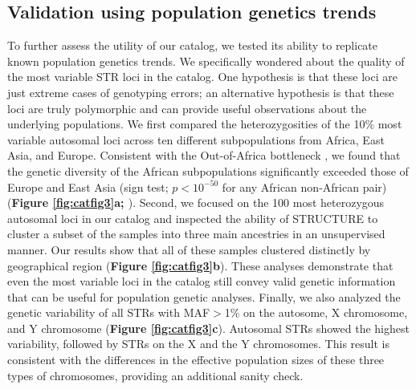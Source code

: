 \subsection{Validation using population genetics trends}
To further assess the utility of our catalog, we tested its ability to replicate known population genetics trends. We specifically wondered about the quality of the most variable STR loci in the catalog. One hypothesis is that these loci are just extreme cases of genotyping errors; an alternative hypothesis is that these loci are truly polymorphic and can provide useful observations about the underlying populations.  We first compared the heterozygosities of the 10\% most variable autosomal loci across ten different subpopulations from Africa, East Asia, and Europe. Consistent with the Out-of-Africa bottleneck \cite{StonekingKrause2011}, we found that the genetic diversity of the African subpopulations significantly exceeded those of Europe and East Asia (sign test; $p < 10^{-50}$ for any African non-African pair) (\textbf{Figure \ref{fig:catfig3}a; \cite{SuppWillemsGymrekHighnamEtAl2014}}). Second, we focused on the 100 most heterozygous autosomal loci in our catalog and inspected the ability of STRUCTURE \cite{PritchardStephensDonnelly2000} to cluster a subset of the samples into three main ancestries in an unsupervised manner. Our results show that all of these samples clustered distinctly by geographical region (\textbf{Figure \ref{fig:catfig3}b}). These analyses demonstrate that even the most variable loci in the catalog still convey valid genetic information that can be useful for population genetic analyses. Finally, we also analyzed the genetic variability of all STRs with MAF$>$1\% on the autosome, X chromosome, and Y chromosome (\textbf{Figure \ref{fig:catfig3}c}). Autosomal STRs showed the highest variability, followed by STRs on the X and the Y chromosomes. This result is consistent with the differences in the effective population sizes of these three types of chromosomes, providing an additional sanity check.  

